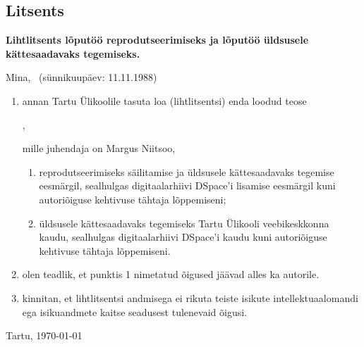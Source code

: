 \documentclass[a4paper,12pt,oneside]{article}
\newenvironment{customFloatWrap}{}{}
\numberwithin{equation}{section}
\theoremstyle{definition}
\begin{document}
\begin{subappendices}
\begin{customFloatWrap}
\begin{verbatim}
\end{verbatim}
\end{customFloatWrap}


\pagebreak 

\makeatletter
\newpage
\pagestyle{empty}
\thispagestyle{empty}

\subsection{Litsents}


\textbf{Lihtlitsents lõputöö reprodutseerimiseks ja
lõputöö üldsusele kätte\-saa\-davaks tegemiseks.}


Mina, \@author\ (sünnikuupäev: 11.11.1988)
\begin{enumerate}
\item annan Tartu Ülikoolile tasuta loa (lihtlitsentsi)
enda loodud teose
\begin{center}
\@title,
\end{center}
mille juhendaja on Margus Niitsoo,
\begin{enumerate}
\item reprodutseerimiseks säilitamise ja üldsusele
kättesaadavaks tegemise eesmärgil, sealhulgas
digitaalarhiivi DSpace'i lisamise eesmärgil kuni
autoriõiguse kehtivuse tähtaja lõppemiseni;
\item üldsusele kättesaadavaks tegemiseks Tartu Ülikooli
veebikeskkonna kaudu, sealhulgas digitaalarhiivi
DSpace'i kaudu kuni autoriõiguse kehti\-vuse tähtaja lõppemiseni.
\end{enumerate}
\item olen teadlik, et punktis 1 nimetatud õigused jäävad
alles ka autorile.
\item kinnitan, et lihtlitsentsi andmisega ei rikuta teiste
isikute intellektuaal\-omandi ega isikuandmete kaitse
seadusest tulenevaid õigusi.
\end{enumerate}

\vfill

\begin{center}
Tartu,  \today
\end{center}

\makeatother


\end{subappendices}
\end{document}
